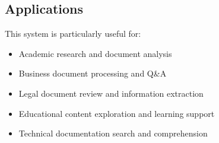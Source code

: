 \subsection{Applications}
This system is particularly useful for:
\begin{itemize}
    \item Academic research and document analysis
    \item Business document processing and Q\&A
    \item Legal document review and information extraction
    \item Educational content exploration and learning support
    \item Technical documentation search and comprehension
\end{itemize} 
